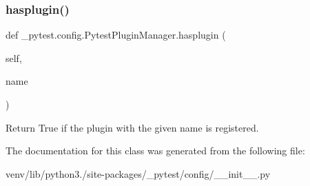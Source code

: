 \subsubsection{\texorpdfstring{hasplugin()}{hasplugin()}}
{\footnotesize\ttfamily def \+\_\+pytest.\+config.\+Pytest\+Plugin\+Manager.\+hasplugin (\begin{DoxyParamCaption}\item[{}]{self,  }\item[{}]{name }\end{DoxyParamCaption})}

\begin{DoxyVerb}Return True if the plugin with the given name is registered.\end{DoxyVerb}
 

The documentation for this class was generated from the following file\+:\begin{DoxyCompactItemize}
\item 
venv/lib/python3./site-\/packages/\+\_\+pytest/config/\+\_\+\+\_\+init\+\_\+\+\_\+.\+py\end{DoxyCompactItemize}
